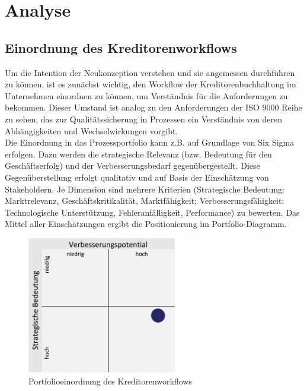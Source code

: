 \chapter{Analyse}

\section{Einordnung des Kreditorenworkflows}
Um die Intention der Neukonzeption verstehen und sie angemessen durchführen zu können, ist es zunächst wichtig, den Workflow der Kreditorenbuchhaltung im Unternehmen einordnen zu können, um Verständnis für die Anforderungen zu bekommen. 
Dieser Umstand ist analog zu den Anforderungen der ISO 9000 Reihe zu sehen, das zur Qualitätssicherung in Prozessen ein Verständnis von deren Abhängigkeiten und Wechselwirkungen vorgibt. \\
Die Einordnung in das Prozessportfolio kann z.B. auf Grundlage von Six Sigma erfolgen.
Dazu werden die strategische Relevanz (bzw. Bedeutung für den Geschäftserfolg) und der Verbesserungsbedarf gegenübergestellt. 
Diese Gegenüberstellung erfolgt qualitativ und auf Basis der Einschätzung von Stakeholdern.
Je  Dimension sind mehrere Kriterien (Strategische Bedeutung: Marktrelevanz, Geschäftskritikalität, Marktfähigkeit; Verbesserungsfähigkeit: Technologische Unterstützung, Fehleranfälligkeit, Performance) zu bewerten. 
Das Mittel aller Einschätzungen ergibt die Positionierung im Portfolio-Diagramm.

\begin{figure}[!htb]
\centering
\includegraphics[height=60mm]{images/portfolio}
\caption{Portfolioeinordnung des Kreditorenworkflows}
\label{Portfolioeinordnung des Kreditorenworkflows}
\end{figure}

